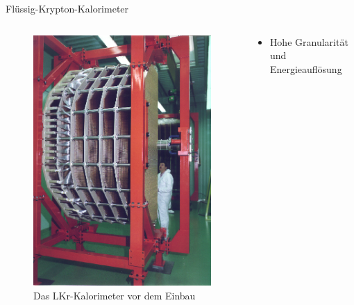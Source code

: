 \documentclass[aspectratio=1610, professionalfonts, 9pt, t]{beamer}
\begin{document}
  \begin{frame}{Flüssig-Krypton-Kalorimeter}
    \begin{columns}[onlytextwidth]
      \begin{column}{0.4\textwidth}
        \begin{figure}[ht]
          \begin{center}
            \includegraphics[height=0.7\textheight]{Images/na48lkr.png} %
            \caption{Das LKr-Kalorimeter vor dem Einbau}
          \end{center}
        \end{figure}
      \end{column}
      \begin{column}{0.5\textwidth}
        \begin{itemize}
          \item Hohe Granularität und Energieauflösung

\end{itemize}
\end{column}
\end{columns}
\end{frame}
\end{document}
